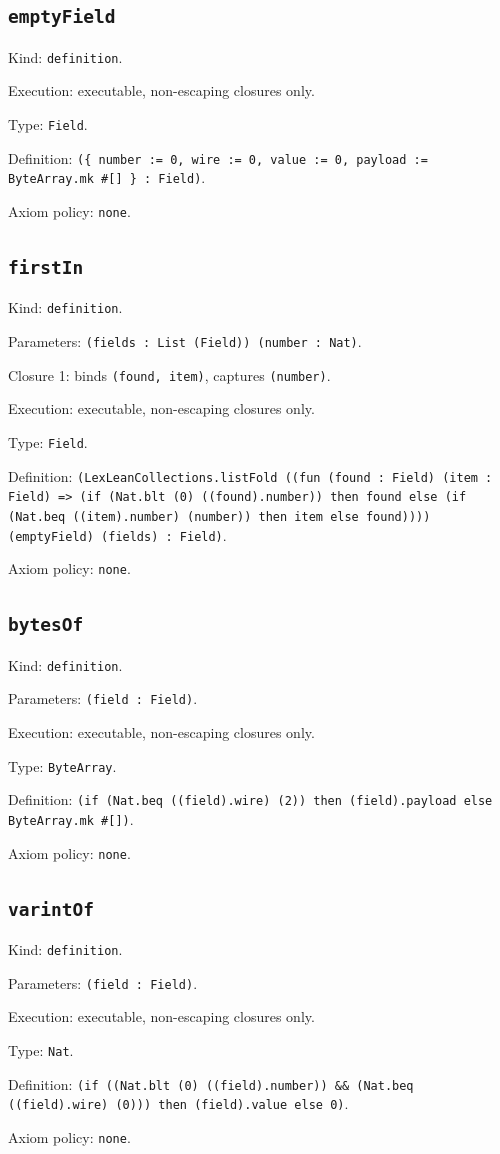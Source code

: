 \documentclass[11pt]{article}
\begin{document}
\subsection*{\texttt{emptyField}}
\noindent Kind: \texttt{definition}.\par
\noindent Execution: executable, non-escaping closures only.\par
\noindent Type: \texttt{Field}.\par
\noindent Definition: \texttt{(\{ number := 0, wire := 0, value := 0, payload := ByteArray.mk \#[] \} : Field)}.\par
\noindent Axiom policy: \texttt{none}.\par
\subsection*{\texttt{firstIn}}
\noindent Kind: \texttt{definition}.\par
\noindent Parameters: \texttt{(fields : List (Field)) (number : Nat)}.\par
\noindent Closure 1: binds \texttt{(found, item)}, captures \texttt{(number)}.\par
\noindent Execution: executable, non-escaping closures only.\par
\noindent Type: \texttt{Field}.\par
\noindent Definition: \texttt{(LexLeanCollections.listFold ((fun (found : Field) (item : Field) => (if (Nat.blt (0) ((found).number)) then found else (if (Nat.beq ((item).number) (number)) then item else found)))) (emptyField) (fields) : Field)}.\par
\noindent Axiom policy: \texttt{none}.\par
\subsection*{\texttt{bytesOf}}
\noindent Kind: \texttt{definition}.\par
\noindent Parameters: \texttt{(field : Field)}.\par
\noindent Execution: executable, non-escaping closures only.\par
\noindent Type: \texttt{ByteArray}.\par
\noindent Definition: \texttt{(if (Nat.beq ((field).wire) (2)) then (field).payload else ByteArray.mk \#[])}.\par
\noindent Axiom policy: \texttt{none}.\par
\subsection*{\texttt{varintOf}}
\noindent Kind: \texttt{definition}.\par
\noindent Parameters: \texttt{(field : Field)}.\par
\noindent Execution: executable, non-escaping closures only.\par
\noindent Type: \texttt{Nat}.\par
\noindent Definition: \texttt{(if ((Nat.blt (0) ((field).number)) \&\& (Nat.beq ((field).wire) (0))) then (field).value else 0)}.\par
\noindent Axiom policy: \texttt{none}.\par
\end{document}
